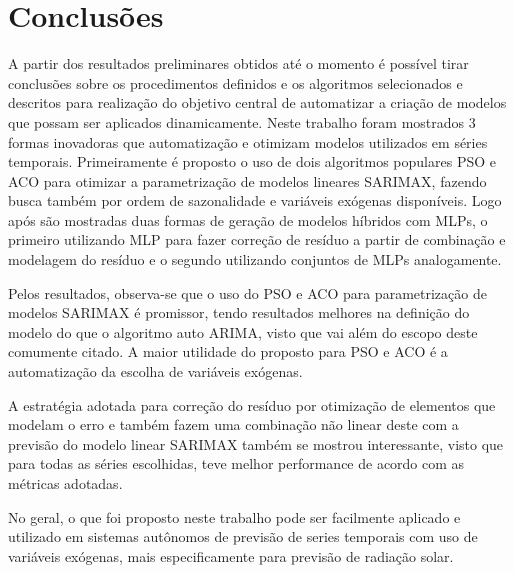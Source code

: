 \chapter{Conclusões}
\label{cap:conclusoes}

A partir dos resultados preliminares obtidos até o momento é possível tirar conclusões sobre os procedimentos definidos e os algoritmos selecionados e descritos para realização do objetivo central de automatizar a criação de modelos que possam ser aplicados dinamicamente. Neste trabalho foram mostrados 3 formas inovadoras que automatização e otimizam modelos utilizados em séries temporais. Primeiramente é proposto o uso de dois algoritmos populares PSO e ACO para otimizar a parametrização de modelos lineares SARIMAX, fazendo busca também por ordem de sazonalidade e variáveis exógenas disponíveis. Logo após são mostradas duas formas de geração de modelos híbridos com MLPs, o primeiro utilizando MLP para fazer correção de resíduo a partir de combinação e modelagem do resíduo e o segundo utilizando conjuntos de MLPs analogamente.

Pelos resultados, observa-se que o uso do PSO e ACO para parametrização de modelos SARIMAX é promissor, tendo resultados melhores na definição do modelo do que o algoritmo auto ARIMA, visto que vai além do escopo deste comumente citado. A maior utilidade do proposto para PSO e ACO é a automatização da escolha de variáveis exógenas.

A estratégia adotada para correção do resíduo por otimização de elementos que modelam o erro e também fazem uma combinação não linear deste com a previsão do modelo linear SARIMAX também se mostrou interessante, visto que para todas as séries escolhidas, teve melhor performance de acordo com as métricas adotadas.

No geral, o que foi proposto neste trabalho pode ser facilmente aplicado e utilizado em sistemas autônomos de previsão de series temporais com uso de variáveis exógenas, mais especificamente para previsão de radiação solar.